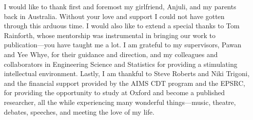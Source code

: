 \vspace{20pt}
I would like to thank first and foremost my girlfriend, Anjuli, and my parents back in Australia. Without your love and support I could not have gotten through this arduous time. I would also like to extend a special thanks to Tom Rainforth, whose mentorship was instrumental in bringing our work to publication---you have taught me a lot. I am grateful to my supervisors, Pawan and Yee Whye, for their guidance and direction, and my colleagues and collaborators in Engineering Science and Statistics for providing a stimulating intellectual environment. Lastly, I am thankful to Steve Roberts and Niki Trigoni, and the financial support provided by the AIMS CDT program and the EPSRC, for providing the opportunity to study at Oxford and become a published researcher, all the while experiencing many wonderful things---music, theatre, debates, speeches, and meeting the love of my life.